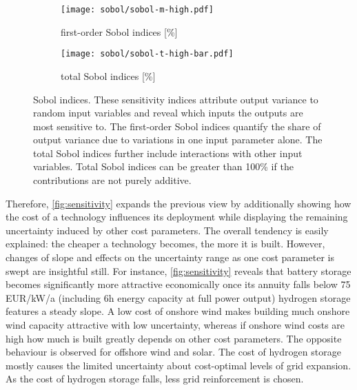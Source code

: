 \begin{figure}
    \begin{subfigure}[t]{0.45\textwidth}
        \caption{first-order Sobol indices [\%]}
        \label{fig:sobol:first}
        \texttt{[image: sobol/sobol-m-high.pdf]}
    \end{subfigure}
    \begin{subfigure}[t]{0.54\textwidth}
        \caption{total Sobol indices [\%]}
        \label{fig:sobol:total}
        \texttt{[image: sobol/sobol-t-high-bar.pdf]}
    \end{subfigure}
    \vspace{-0.3cm}
    \caption[First-order and total Sobol indices]{
      Sobol indices. These sensitivity indices attribute output variance to random input variables
      and reveal which inputs the outputs are most sensitive to. The first-order Sobol indices
      quantify the share of output variance due to variations in one input parameter alone.
      The total Sobol indices further include interactions with other input variables.
      Total Sobol indices can be greater than 100\% if the contributions are not purely additive.
    }
    \label{fig:sobol}
\end{figure}


Therefore, \cref{fig:sensitivity} expands the previous view by additionally
showing how the cost of a technology influences its deployment while displaying
the remaining uncertainty induced by other cost parameters. The overall tendency
is easily explained: the cheaper a technology becomes, the more it is built.
However, changes of slope and effects on the uncertainty range as one cost
parameter is swept are insightful still. For instance, \cref{fig:sensitivity}
reveals that battery storage becomes significantly more attractive economically
once its annuity falls below 75 EUR/kW/a (including 6h energy capacity at full
power output) hydrogen storage features a steady slope. A low cost of onshore
wind makes building much onshore wind capacity attractive with low uncertainty,
whereas if onshore wind costs are high how much is built greatly depends on
other cost parameters. The opposite behaviour is observed for offshore wind and
solar. The cost of hydrogen storage mostly causes the limited uncertainty about
cost-optimal levels of grid expansion. As the cost of hydrogen storage falls,
less grid reinforcement is chosen.

